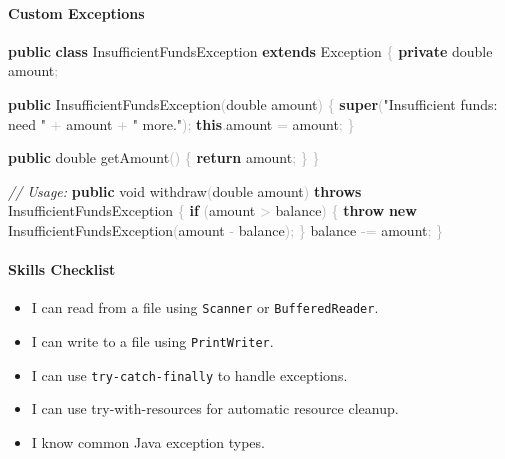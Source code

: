 \documentclass[
  justified,
  openright,
]{tufte-book}
\let\subsection\paragraph
\let\paragraph\paragraph
\newcommand{\KeywordTok}[1]{\textcolor{CodeKeyword}{\textbf{#1}}}  %
\newcommand{\StringTok}[1]{\textcolor{CodeString}{#1}}              %
\newcommand{\CommentTok}[1]{\textcolor{CodeComment}{\textit{#1}}}  %
\newcommand{\CodeFuncTok}[1]{\textcolor{CodeKeyword}{#1}}           %
\newcommand{\CodeTypeTok}[1]{\textcolor{CodeType}{#1}}              %
\newcommand{\OperatorTok}[1]{\textcolor{DarkGray}{#1}}              %
\newenvironment{Shaded}{%
  \begin{mdframed}[style=TufteCode]%
}{%
  \end{mdframed}%
}
\let\subsection\paragraph
\let\paragraph\paragraph
\providecommand{\tightlist}{%
  \setlength{\itemsep}{0pt}\setlength{\parskip}{0pt}}
\begin{document}
\subsection{Custom Exceptions}\label{custom-exceptions}

\begin{Shaded}
\begin{Highlighting}[]
\KeywordTok{public} \KeywordTok{class} InsufficientFundsException \KeywordTok{extends} Exception \OperatorTok{\{}
    \KeywordTok{private} \CodeTypeTok{double} amount\OperatorTok{;}
 
    \KeywordTok{public} \CodeFuncTok{InsufficientFundsException}\OperatorTok{(}\CodeTypeTok{double} amount\OperatorTok{)} \OperatorTok{\{}
        \KeywordTok{super}\OperatorTok{(}\StringTok{"Insufficient funds: need "} \OperatorTok{+} amount \OperatorTok{+} \StringTok{" more."}\OperatorTok{);}
        \KeywordTok{this}\OperatorTok{.}\CodeFuncTok{amount} \OperatorTok{=} amount\OperatorTok{;}
    \OperatorTok{\}}
 
    \KeywordTok{public} \CodeTypeTok{double} \CodeFuncTok{getAmount}\OperatorTok{()} \OperatorTok{\{} \KeywordTok{return} amount\OperatorTok{;} \OperatorTok{\}}
\OperatorTok{\}}
 
\CommentTok{// Usage:}
\KeywordTok{public} \CodeTypeTok{void} \CodeFuncTok{withdraw}\OperatorTok{(}\CodeTypeTok{double} amount\OperatorTok{)} \KeywordTok{throws} InsufficientFundsException \OperatorTok{\{}
    \KeywordTok{if} \OperatorTok{(}amount \OperatorTok{\textgreater{}} balance\OperatorTok{)} \OperatorTok{\{}
        \KeywordTok{throw} \KeywordTok{new} \CodeFuncTok{InsufficientFundsException}\OperatorTok{(}amount \OperatorTok{{-}} balance\OperatorTok{);}
    \OperatorTok{\}}
    balance \OperatorTok{{-}=} amount\OperatorTok{;}
\OperatorTok{\}}
\end{Highlighting}
\end{Shaded}

\subsection{Skills Checklist}\label{skills-checklist-84}

\begin{itemize}
\tightlist
\item[$\square$]
  I can read from a file using \texttt{Scanner} or
  \texttt{BufferedReader}.
\item[$\square$]
  I can write to a file using \texttt{PrintWriter}.
\item[$\square$]
  I can use \texttt{try-catch-finally} to handle exceptions.
\item[$\square$]
  I can use try-with-resources for automatic resource cleanup.
\item[$\square$]
  I know common Java exception types.
\end{itemize}
\end{document}
